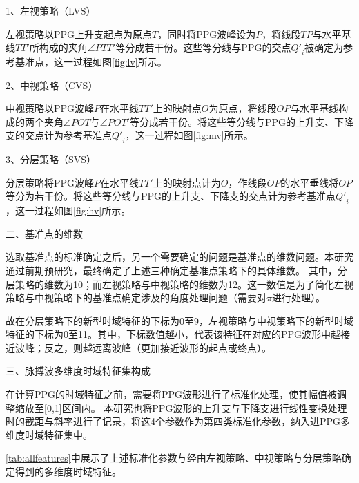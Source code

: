 1、左视策略（LVS）

左视策略以PPG上升支起点为原点$T$，同时将PPG波峰设为$P$，将线段$TP$与水平基线$TT'$所构成的夹角$\angle PTT'$等分成若干份。这些等分线与PPG的交点${Q'}_i$被确定为参考基准点，这一过程如图\autoref{fig:lv}所示。

2、中视策略（CVS）

中视策略以PPG波峰$P$在水平线$TT'$上的映射点$O$为原点，将线段$OP$与水平基线构成的两个夹角$\angle POT$与$\angle POT'$等分成若干份。将这些等分线与PPG的上升支、下降支的交点计为参考基准点${Q'}_i$，这一过程如图\autoref{fig:mv}所示。

3、分层策略（SVS）

分层策略将PPG波峰$P$在水平线$TT'$上的映射点计为$O$，作线段$OP$的水平垂线将$OP$等分为若干份。将这些等分线与PPG的上升支、下降支的交点计为参考基准点${Q'}_i$，这一过程如图\autoref{fig:hv}所示。

二、基准点的维数

选取基准点的标准确定之后，另一个需要确定的问题是基准点的维数问题。本研究通过前期预研究，最终确定了上述三种确定基准点策略下的具体维数。
其中，分层策略的维数为10；而左视策略与中视策略的维数为12。这一数值是为了简化左视策略与中视策略下的基准点确定涉及的角度处理问题（需要对$\pi$进行处理）。

故在分层策略下的新型时域特征的下标为0至9，左视策略与中视策略下的新型时域特征的下标为0至11。其中，下标数值越小，代表该特征在对应的PPG波形中越接近波峰；反之，则越远离波峰（更加接近波形的起点或终点）。

三、脉搏波多维度时域特征集构成

在计算PPG的时域特征之前，需要将PPG波形进行了标准化处理，使其幅值被调整缩放至[0,1]区间内。
本研究也将PPG波形的上升支与下降支进行线性变换处理时的截距与斜率进行了记录，将这4个参数作为第四类标准化参数，纳入进PPG多维度时域特征集中。

\autoref{tab:allfeatures}中展示了上述标准化参数与经由左视策略、中视策略与分层策略确定得到的多维度时域特征。

